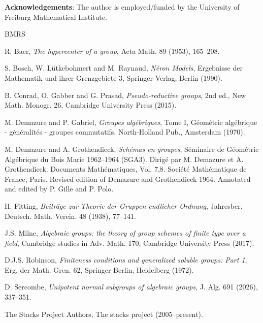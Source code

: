 \documentclass[twoside,a4paper,reqno,11pt]{amsart}
\theoremstyle{definition}
\begin{document}
\bigskip\noindent
{\textbf {Acknowledgements}}:
The author is employed/funded by the University of Freiburg Mathematical Institute.



\newcommand{\etalchar}[1]{$^{#1}$}
\providecommand{\bysame}{\leavevmode\hbox to3em{\hrulefill}\thinspace}
\providecommand{\MR}{\relax\ifhmode\unskip\space\fi MR }
\providecommand{\MRhref}[2]{%
	\href{http://www.ams.org/mathscinet-getitem?mr=#1}{#2} }
\providecommand{\href}[2]{#2}
\begin{thebibliography}{BMRS}


 {\sc R. Baer}, {\em The hypercenter of a group}, Acta Math. 89 (1953), 165--208.

 {\sc S. Bosch, W. Lütkebohmert and M. Raynaud}, {\em N\'eron Models}, Ergebnisse der Mathematik und ihrer Grenzgebiete 3, Springer-Verlag, Berlin (1990).

 {\sc B. Conrad, O. Gabber and G. Prasad}, {\em Pseudo-reductive groups}, 2nd ed., New Math. Monogr. 26, Cambridge University Press (2015).

 {\sc M. Demazure and P. Gabriel}, {\em Groupes algébriques}, Tome I, Géométrie algébrique - généralités - groupes commutatifs, North-Holland Pub., Amsterdam (1970).

 {\sc M. Demazure and A. Grothendieck}, {\em Sch\'emas en groupes}, S\'eminaire de G\'eom\'etrie Alg\'ebrique du Bois Marie 1962--1964 (SGA3). Dirig\'e par M. Demazure et A. Grothendieck. Documents Math\'ematiques, Vol. 7,8. Soci\'et\'e Math\'ematique de France, Paris. Revised edition of Demazure and Grothendieck 1964. Annotated and edited by P. Gille and P. Polo.

 {\sc H. Fitting}, {\em Beiträge zur Theorie der Gruppen endlicher Ordnung}, Jahresber. Deutsch. Math. Verein. 48 (1938), 77--141.

 {\sc J.S. Milne}, {\em Algebraic groups: the theory of group schemes of finite type over a field}, Cambridge studies in Adv. Math. 170, Cambridge University Press (2017).

 {\sc D.J.S. Robinson}, {\em Finiteness conditions and generalized soluble groups: Part 1}, Erg. der Math. Gren. 62, Springer Berlin, Heidelberg (1972).
 
 {\sc D. Sercombe}, {\em Unipotent normal subgroups of algebraic groups}, J. Alg. 691 (2026), 337--351.

 {\sc The Stacks Project Authors}, The stacks project (2005--present).
\end{thebibliography}
\end{document}
